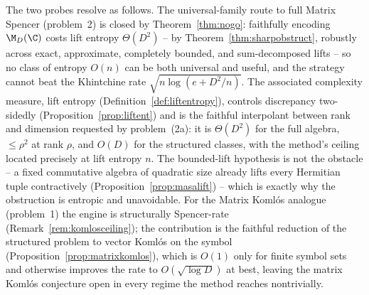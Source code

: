 The two probes resolve as follows. The universal-family route to full Matrix
Spencer (problem~2) is closed by Theorem~\ref{thm:nogo}: faithfully encoding
$\M_D(\C)$ costs lift entropy $\Theta(D^2)$ -- by Theorem~\ref{thm:sharpobstruct},
robustly across exact, approximate, completely bounded, and sum-decomposed lifts
-- so no class of entropy $O(n)$ can be both universal and useful, and the strategy
cannot beat the Khintchine rate $\sqrt{n\log(e+D^2/n)}$. The associated complexity
measure, lift entropy (Definition~\ref{def:liftentropy}), controls discrepancy
two-sidedly (Proposition~\ref{prop:liftent}) and is the faithful interpolant
between rank and dimension requested by problem~(2a): it is $\Theta(D^2)$ for the
full algebra, $\le\rho^2$ at rank $\rho$, and $O(D)$ for the structured classes,
with the method's ceiling located precisely at lift entropy $n$. The bounded-lift
hypothesis is not the obstacle -- a fixed commutative algebra of quadratic size
already lifts every Hermitian tuple contractively
(Proposition~\ref{prop:masalift}) -- which is exactly why the obstruction is
entropic and unavoidable. For the Matrix Koml\'os analogue (problem~1) the engine
is structurally Spencer-rate (Remark~\ref{rem:komlosceiling}); the contribution is
the faithful reduction of the structured problem to vector Koml\'os on the symbol
(Proposition~\ref{prop:matrixkomlos}), which is $O(1)$ only for finite symbol sets
and otherwise improves the rate to $O(\sqrt{\log D})$ at best, leaving the matrix
Koml\'os conjecture open in every regime the method reaches nontrivially.

%
%
%
